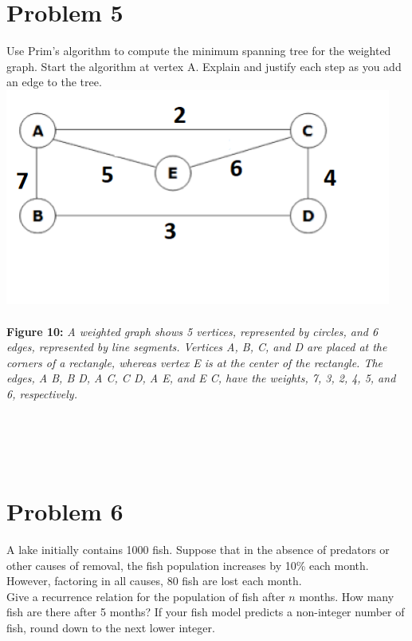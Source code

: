 \documentclass{amsart}
\theoremstyle{definition}
\theoremstyle{Exercise}
\theoremstyle{remark}
\theoremstyle{rule}
\numberwithin{equation}{section}
\begin{document}
  \section*{Problem 5}
  Use Prim's algorithm to compute the minimum spanning tree for the weighted graph. Start the algorithm at vertex A. Explain and justify each step as you add an edge to the tree.
\\
\includegraphics[width=5in]{prim}
\\\\
{\color{blue} {\bf Figure 10:} \emph{A weighted graph shows 5 vertices, represented by circles, and 6 edges, represented by line segments. Vertices A, B, C, and D are placed at the corners of a rectangle, whereas vertex E is at the center of the rectangle. The edges, A B, B D, A C, C D, A E, and E C, have the weights, 7, 3, 2, 4, 5, and 6, respectively.
  }
}
\\\\
\\\\
 \newpage
~\\
  \section*{Problem 6}
A lake initially contains 1000 fish. Suppose that in the absence of predators or other causes of removal, the fish population increases by 10\% each month. However, factoring in all causes, 80 fish are lost each month.\\

Give a recurrence relation for the population of fish after $n$ months. How many fish are there after 5 months? If your fish model predicts a non-integer number of fish, round down to the next lower integer.
\\\\
\\\\
\end{document}
